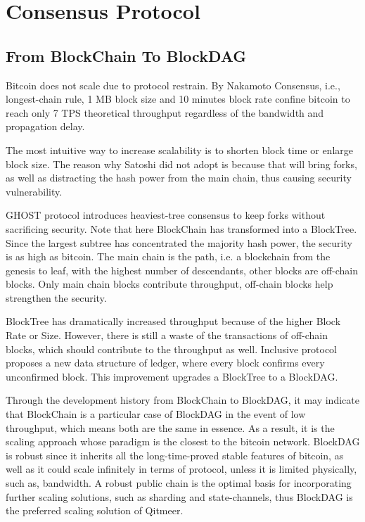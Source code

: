 \documentclass[a4paper,11pt]{article}
\begin{document}
\section{Consensus Protocol}


\subsection{From BlockChain To BlockDAG}
Bitcoin does not scale due to protocol restrain. By Nakamoto Consensus, i.e., longest-chain rule, 1 MB block size and 10 minutes block rate confine bitcoin to reach only 7 TPS theoretical throughput regardless of the bandwidth and propagation delay.

The most intuitive way to increase scalability is to shorten block time or enlarge block size. The reason why Satoshi did not adopt is because that will bring forks, as well as distracting the hash power from the main chain, thus causing security vulnerability.

GHOST protocol introduces heaviest-tree consensus to keep forks without sacrificing security. Note that here BlockChain has transformed into a BlockTree. Since the largest subtree has concentrated the majority hash power, the security is as high as bitcoin. The main chain is the path, i.e. a blockchain from the genesis to leaf, with the highest number of descendants, other blocks are off-chain blocks. Only main chain blocks contribute throughput, off-chain blocks help strengthen the security. 

BlockTree has dramatically increased throughput because of the higher Block Rate or Size. However, there is still a waste of the transactions of off-chain blocks, which should contribute to the throughput as well. Inclusive protocol proposes a new data structure of ledger, where every block confirms every unconfirmed block. This improvement upgrades a BlockTree to a BlockDAG.

Through the development history from BlockChain to BlockDAG, it may indicate  that BlockChain is a particular case of BlockDAG in the event of low throughput, which means both are the same in essence. As a result,  it is the scaling approach whose paradigm is the closest to the bitcoin network. BlockDAG is robust since it inherits all the long-time-proved stable features of bitcoin,  as well as it could scale infinitely in terms of protocol, unless it is limited physically, such as, bandwidth. A robust public chain is the optimal basis for incorporating further scaling solutions, such as sharding and state-channels, thus BlockDAG is the preferred scaling solution of Qitmeer.
\end{document}
